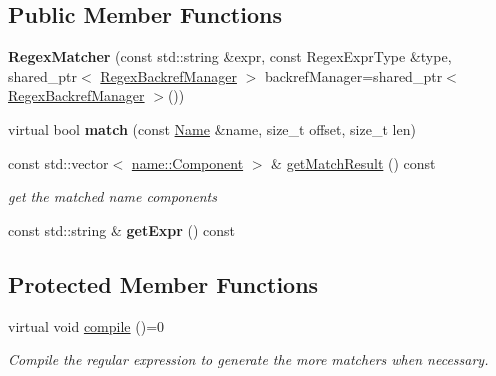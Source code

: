 \subsection*{Public Member Functions}
\begin{DoxyCompactItemize}
\item 
{\bfseries Regex\+Matcher} (const std\+::string \&expr, const Regex\+Expr\+Type \&type, shared\+\_\+ptr$<$ \hyperlink{classndn_1_1RegexBackrefManager}{Regex\+Backref\+Manager} $>$ backref\+Manager=shared\+\_\+ptr$<$ \hyperlink{classndn_1_1RegexBackrefManager}{Regex\+Backref\+Manager} $>$())\hypertarget{classndn_1_1RegexMatcher_a532e9f50d744d43cd30ac4c7e5469ff0}{}\label{classndn_1_1RegexMatcher_a532e9f50d744d43cd30ac4c7e5469ff0}

\item 
virtual bool {\bfseries match} (const \hyperlink{classndn_1_1Name}{Name} \&name, size\+\_\+t offset, size\+\_\+t len)\hypertarget{classndn_1_1RegexMatcher_a67a4209f77886d78dcba710749a34921}{}\label{classndn_1_1RegexMatcher_a67a4209f77886d78dcba710749a34921}

\item 
const std\+::vector$<$ \hyperlink{classndn_1_1name_1_1Component}{name\+::\+Component} $>$ \& \hyperlink{classndn_1_1RegexMatcher_a3356e0c7b56e16c8dffc431db943fc16}{get\+Match\+Result} () const
\begin{DoxyCompactList}\small\item\em get the matched name components \end{DoxyCompactList}\item 
const std\+::string \& {\bfseries get\+Expr} () const\hypertarget{classndn_1_1RegexMatcher_a8c22e9addf27d3d46c6e816263f10486}{}\label{classndn_1_1RegexMatcher_a8c22e9addf27d3d46c6e816263f10486}

\end{DoxyCompactItemize}
\subsection*{Protected Member Functions}
\begin{DoxyCompactItemize}
\item 
virtual void \hyperlink{classndn_1_1RegexMatcher_a95189df49e9119adcced9b555a721e9a}{compile} ()=0
\begin{DoxyCompactList}\small\item\em Compile the regular expression to generate the more matchers when necessary. \end{DoxyCompactList}\end{DoxyCompactItemize}
